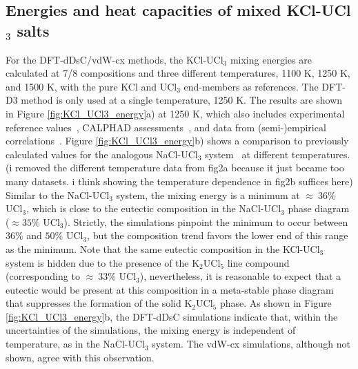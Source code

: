 \documentclass[preprint,3p,10pt,number,sort&compress]{elsarticle}
\begin{document}
\subsection{Energies and heat capacities of mixed KCl-UCl$_3$ salts}
For the DFT-dDsC/vdW-cx methods, the KCl-UCl$_3$ mixing energies are calculated at 7/8 compositions and three different temperatures, 1100 K, 1250 K, and 1500 K, with the pure KCl and UCl$_3$ end-members as references. The DFT-D3 method is only used at a single temperature, 1250 K. The results are shown in Figure \ref{fig:KCl_UCl3_energy}a) at 1250 K, which also includes experimental reference values~\cite{Rycerz}, CALPHAD assessments~\cite{YIN2020,Ghosh}, and data from (semi-)empirical correlations~\cite{Pinto}. 
Figure \ref{fig:KCl_UCl3_energy}b) shows a comparison to previously calculated values for the analogous NaCl-UCl$_3$ system~\cite{Andersson} at different temperatures. {\color{red} (i removed the different temperature data from fig2a because it just became too many datasets. i think showing the temperature dependence in fig2b suffices here)} 
Similar to the NaCl-UCl$_3$ system, the mixing energy is a minimum at $\approx~36$\% UCl$_3$, which is close to the eutectic composition in the NaCl-UCl$_3$ phase diagram ($\approx 35$\% UCl$_3$). Strictly, the simulations pinpoint the minimum to occur between $36$\% and $50$\% UCl$_3$, but the composition trend favors the lower end of this range as the minimum. Note that the same eutectic composition in the KCl-UCl$_3$ system is hidden due to the presence of the K$_2$UCl$_5$ line compound (corresponding to $\approx~33$\% UCl$_3$), nevertheless, it is reasonable to expect that a eutectic would be present at this composition in a meta-stable phase diagram that suppresses the formation of the solid K$_2$UCl$_5$ phase. As shown in Figure \ref{fig:KCl_UCl3_energy}b, the DFT-dDsC simulations indicate that, within the uncertainties of the simulations, the mixing energy is independent of temperature, as in the NaCl-UCl$_3$ system. The vdW-cx simulations, although not shown, agree with this observation.  
\end{document}
